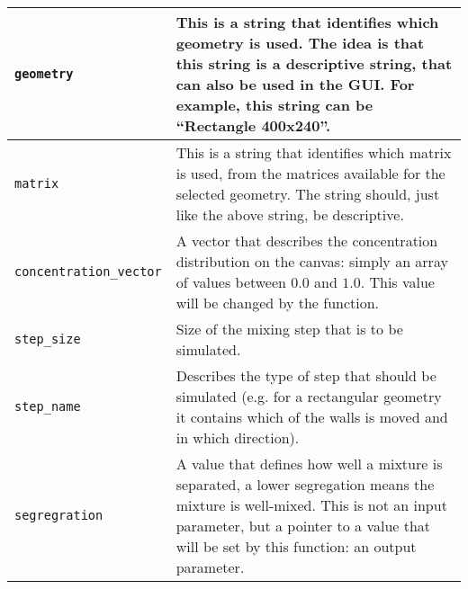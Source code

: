 \begin{longtable}{@{}lX@{}}
	\toprule
	\endfirsthead
	\midrule
	\endhead
	
	\texttt{geometry} & This is a string that identifies which geometry is used. The idea is that this string is a descriptive string, that can also be used in the GUI. For example, this string can be ``Rectangle 400x240''. \\
	\midrule
	
	\texttt{matrix} & This is a string that identifies which matrix is used, from the matrices available for the selected geometry. The string should, just like the above string, be descriptive. \\
	\midrule
	
	\texttt{concentration\_vector} & A vector that describes the concentration distribution on the canvas: simply an array of values between $0.0$ and $1.0$. This value will be changed by the function. \\
	\midrule
	
	\texttt{step\_size} & Size of the mixing step that is to be simulated. \\
	\midrule
	
	\texttt{step\_name} & Describes the type of step that should be simulated (e.g. for a rectangular geometry it contains which of the walls is moved and in which direction). \\
	\midrule
	
	\texttt{segregration} & A value that defines how well a mixture is separated, a lower segregation means the mixture is well-mixed. This is not an input parameter, but a pointer to a value that will be set by this function: an output parameter. \\
	\bottomrule
\end{longtable}